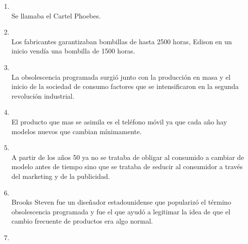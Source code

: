 \documentclass[spanish,openany]{report}
\begin{document}
\begin{enumerate}%
        \item{}\\
            Se llamaba el Cartel Phoebes. 
        \item{}\\
            Los fabricantes garantizaban bombillas de hasta 2500 horas, Edison en un inicio vendía una bombilla de 1500 horas.
        \item{}\\
            La obsolescencia programada surgió junto con la producción en masa y el inicio de la sociedad de consumo
            factores que se intensificaron en la segunda revolución industrial.
        \item{}\\
            El producto que mas se asimila es el teléfono móvil ya que cada año hay modelos nuevos que cambian mínimamente.
        \item{}\\
            A partir de los años 50 ya no se trataba de obligar al consumido a cambiar de modelo antes de tiempo sino que se trataba
            de seducir al consumidor a través del marketing y de la publicidad.
        \item{}\\
            Brooks Steven fue un diseñador estadounidense que popularizó el término obsolescencia programada
            y fue el que ayudó a legitimar la idea de que el cambio frecuente de productos era algo normal.
        \item{}\\

\end{enumerate}
\end{document}
